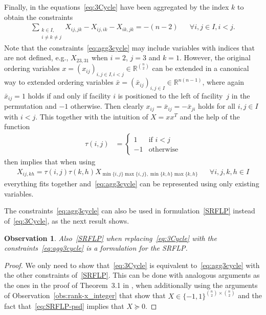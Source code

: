 \documentclass{article}
\newcommand{\SRFLP}{SRFLP\xspace}
\newtheorem{observation}[theorem]{Observation}
\begin{document}
Finally, in \citet{anjos_provably_2009} the equations~\eqref{eq:3Cycle} have been aggregated by the index $k$ to obtain the constraints
\begin{align}
    \sum_{\substack{k \in I, \\ i \neq k \neq j}} X_{ij,jk} - X_{ij,ik} - X_{ik,jk} = -(n-2) && 
    \forall i, j \in I, i < j. \label{eq:agg3cycle}
\end{align}
Note that the constraints~\eqref{eq:agg3cycle} may include variables with indices that are not defined, e.g., $X_{23,31}$ when $i=2$, $j=3$ and $k=1$. 
However, the original ordering variables $x = (x_{ij})_{i,j \in I, i < j} \in \mathbb R^{\binom{n}{2}}$ can be extended in a canonical way to extended ordering variables $\bar{x} = (\bar{x}_{ij})_{i,j \in I} \in \mathbb R^{n(n-1)}$, where again $\bar{x}_{ij}=1$ holds if and only if facility $i$ is positioned to the left of facility~$j$ in the permutation and $-1$ otherwise. 
Then clearly $x_{ij} = \bar{x}_{ij} = -\bar{x}_{ji}$ holds for all $i,j \in I$ with $i<j$. This together with the intuition of $X = xx^T$ and the help of the function
\begin{align*}
    \tau(i,j) &= 
    \begin{cases}
        1 & \text{if } i < j \\
        -1 & \text{otherwise} 
    \end{cases}
\end{align*}
then implies that when using
\begin{align}\label{eq:transformationileqj}
    X_{ij,kh} = \tau(i,j) \tau(k,h) X_{\min\{i,j\}\max\{i,j\}, \min\{k,h\}\max\{k,h\}} && 
    \forall i, j,k,h \in I 
\end{align}
everything fits together and~\eqref{eq:agg3cycle} can be represented using only existing variables.

The constraints~\eqref{eq:agg3cycle} can also be used in formulation~\eqref{SRFLP} instead of~\eqref{eq:3Cycle}, as the next result shows.

\begin{observation}
   Also~\eqref{SRFLP} when replacing~\eqref{eq:3Cycle} with the constraints~\eqref{eq:agg3cycle} is a formulation for the \SRFLP.
\end{observation}
\begin{proof}
    We only need to show that~\eqref{eq:3Cycle} is equivalent to~\eqref{eq:agg3cycle} with the other constraints of~\eqref{SRFLP}.
    This can be done with analogous arguments as the ones in the proof of Theorem~3.1 in \citet{anjos_provably_2009}, when additionally using the arguments of Observation~\ref{obs:rank-x_integer} that show that $X \in \{-1,1\}^{\binom{n}{2} \times \binom{n}{2}}$ and the fact that~\eqref{eq:SRFLP-psd} implies that $X \succeq 0$.
\end{proof}
\end{document}
